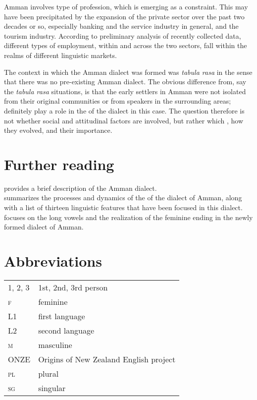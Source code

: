 \documentclass[output=paper]{langsci/langscibook}
\begin{document}
Amman involves type of profession, which is emerging as a constraint. This may have been precipitated by the expansion of the private sector over the past two decades or so, especially banking and the service industry in general, and the tourism industry. According to preliminary analysis of recently collected data, different types of employment, within and across the two sectors, fall within the realms of different linguistic markets.

The context in which the Amman dialect was formed was \textit{tabula rasa} in the sense that there was no pre-existing Amman dialect. The obvious difference from, say the \textit{tabula rasa}  situations, is that the early settlers in Amman were not isolated from their original communities or from  speakers in the surrounding areas;  definitely play a role in the  of the dialect in this case. The question therefore is not whether social and attitudinal factors are involved, but rather which , how they evolved, and their  importance.

\section*{Further reading}

\citet{Al-Wer2011Amman} provides a brief description of the Amman dialect.\\
\citet{Al-Wer2007} summarizes the processes and dynamics of the  of the dialect of Amman, along with a list of thirteen linguistic features that have been focused in this dialect.\\
\citet{Al-Wer2002furtherreading} focuses on the long vowels and the realization of the feminine ending in the newly formed dialect of Amman.



\section*{Abbreviations}

\begin{tabularx}{1\textwidth}{@{}lQ@{}}
\textsc{1, 2, 3} & 1st, 2nd, 3rd person \\
\textsc{f}  &  feminine\\
L1 & first language \\
L2 & second language \\
\textsc{m}  &  masculine\\
ONZE & Origins of New Zealand {English} project \\
\textsc{pl}  &  plural\\
\textsc{sg}  &  singular\\
\end{tabularx}%


{\sloppy\printbibliography[heading=subbibliography,notkeyword=this]}
\end{document}
